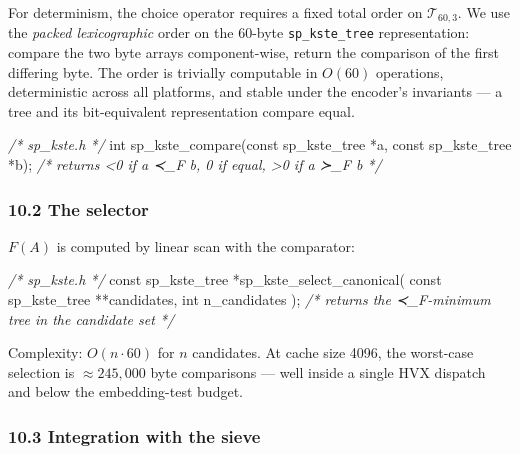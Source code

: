 \documentclass[
  11pt,
]{article}
\newenvironment{Shaded}{}{}
\newcommand{\CommentTok}[1]{\textcolor[rgb]{0.38,0.63,0.69}{\textit{#1}}}
\newcommand{\DataTypeTok}[1]{\textcolor[rgb]{0.56,0.13,0.00}{#1}}
\newcommand{\NormalTok}[1]{#1}
\begin{document}
For determinism, the choice operator requires a fixed total order on
\(\mathcal{T}_{60,3}\). We use the \emph{packed lexicographic} order on
the 60-byte \texttt{sp\_kste\_tree} representation: compare the two byte
arrays component-wise, return the comparison of the first differing
byte. The order is trivially computable in \(O(60)\) operations,
deterministic across all platforms, and stable under the encoder's
invariants --- a tree and its bit-equivalent representation compare
equal.

\begin{Shaded}
\begin{Highlighting}[]
\CommentTok{/* sp\_kste.h */}
\DataTypeTok{int}\NormalTok{ sp\_kste\_compare(}\DataTypeTok{const}\NormalTok{ sp\_kste\_tree *a, }\DataTypeTok{const}\NormalTok{ sp\_kste\_tree *b);}
\CommentTok{/* returns \textless{}0 if a ≺\_F b, 0 if equal, \textgreater{}0 if a ≻\_F b */}
\end{Highlighting}
\end{Shaded}

\hypertarget{the-selector}{%
\subsubsection{10.2 The selector}\label{the-selector}}

\(F(A)\) is computed by linear scan with the comparator:

\begin{Shaded}
\begin{Highlighting}[]
\CommentTok{/* sp\_kste.h */}
\DataTypeTok{const}\NormalTok{ sp\_kste\_tree *sp\_kste\_select\_canonical(}
    \DataTypeTok{const}\NormalTok{ sp\_kste\_tree **candidates,}
    \DataTypeTok{int}\NormalTok{ n\_candidates}
\NormalTok{);}
\CommentTok{/* returns the ≺\_F{-}minimum tree in the candidate set */}
\end{Highlighting}
\end{Shaded}

Complexity: \(O(n \cdot 60)\) for \(n\) candidates. At cache size 4096,
the worst-case selection is \(\approx 245{,}000\) byte comparisons ---
well inside a single HVX dispatch and below the embedding-test budget.

\hypertarget{integration-with-the-sieve}{%
\subsubsection{10.3 Integration with the
sieve}\label{integration-with-the-sieve}}
\end{document}
